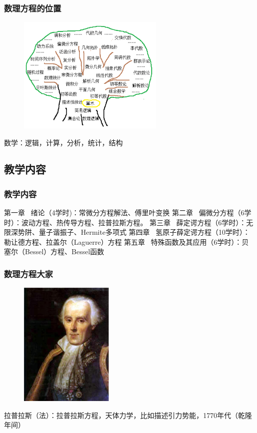 \begin{frame}
	\frametitle{数理方程的位置}
	\begin{center}
		\begin{figure}
			\includegraphics[width=7cm]{figs/fig1-1.png}	
		\end{figure}
		{ 数学：逻辑，计算，分析，统计，结构}
	\end{center}
\end{frame}

\subsection{教学内容}

\begin{frame}
	\frametitle{教学内容}
	\begin{enumerate}
			\Item 第一章 ~绪论（4学时)：常微分方程解法、傅里叶变换
			\vspace{0.2cm}
			\Item 第二章~ 偏微分方程（6学时）：波动方程、热传导方程、拉普拉斯方程。
			\vspace{0.2cm}
			\Item 第三章 ~薛定谔方程（6学时）：无限深势阱、量子谐振子、Hermite多项式
            \vspace{0.2cm}
            \Item 第四章 ~氢原子薛定谔方程（10学时）：勒让德方程、拉盖尔（Laguerre）方程
            \vspace{0.2cm}
            \Item 第五章~ 特殊函数及其应用（6学时）：贝塞尔（Bessel）方程、Bessel函数
     \end{enumerate}	
\end{frame}

\begin{frame}
	\frametitle{数理方程大家}
	\begin{center}
		\begin{figure}
			\includegraphics[width=4.5cm]{figs/fig1-3-1.png}	
		\end{figure}
	\end{center}
	{拉普拉斯（法）：拉普拉斯方程，天体力学，比如描述引力势能，1770年代（乾隆年间）}
\end{frame}

